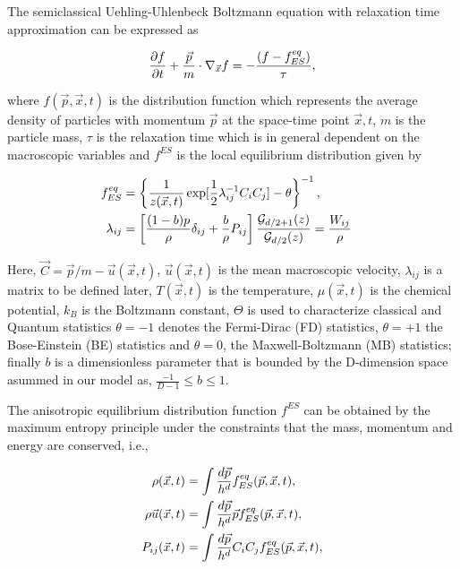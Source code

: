 \documentclass[doublecol]{epl2}
\begin{document}
The semiclassical Uehling-Uhlenbeck Boltzmann equation with relaxation time approximation can be expressed as

\begin{align}
{\partial f \over \partial t} + {\vec p \over m } \cdot \nabla_{\vec x} f  =  -{(f - f^{eq}_{ES}) \over \tau},
\end{align}

where  $f(\vec p, \vec x, t)$ is the distribution function which represents the average density of particles with momentum $\vec p$ at the space-time point $\vec x, t$, $m$ is the particle mass, $\tau$ is the relaxation time which is in general dependent on the macroscopic variables and $f^{ES}$ is the local equilibrium distribution given by

\begin{align}
f^{eq}_{ES} &=\left\{ {1 \over z(\vec x,t) } \exp[ {1\over 2} \lambda_{i j}^{-1} C_{i} C_{j} ] - \theta \right\}^{-1}, \\
\lambda_{i j} &= \left[\frac{(1-b)p}{\rho} \delta_{i j}+ \frac{b}{\rho}P_{i j } \right] \frac{\mathcal{G}_{d/2+1}(z)}{\mathcal{G}_{d/2}(z)} = \frac{W_{i j}}{\rho}&
\end{align}

Here, $\vec C=\vec p/m -\vec u(\vec x,t)$, $\vec u(\vec x,t)$ is the mean macroscopic velocity, $\lambda_{i j}$ is a matrix to be defined later, $T(\vec x,t)$ is the temperature, $\mu(\vec x,t)$ is the chemical potential, $k_B$ is the Boltzmann constant, $\Theta$ is used to characterize classical and Quantum statistics $\theta = -1$ denotes the Fermi-Dirac (FD) statistics, $\theta = +1$ the Bose-Einstein (BE) statistics and $\theta = 0$, the Maxwell-Boltzmann (MB) statistics; finally $b$ is a dimensionless parameter that is bounded by the D-dimension space asummed in our model as, $\frac{-1}{D-1} \le b \le 1$.

The anisotropic equilibrium distribution function $f^{ES}$ can be obtained by the maximum entropy principle under the constraints that the mass, momentum and energy are conserved, i.e.,

\begin{align}
\rho(\vec x, t) &= \int {d \vec p \over h^d}   f^{eq}_{ES}(\vec p, \vec x, t), \\
\rho \vec u(\vec x, t) &= \int {d \vec p \over h^d} \vec p  f^{eq}_{ES}(\vec p, \vec x, t), \\
P_{i j}(\vec x, t) &= \int {d \vec p \over h^d} C_{i} C_{j} f^{eq}_{ES}(\vec p, \vec x, t),
\end{align}
\end{document}
